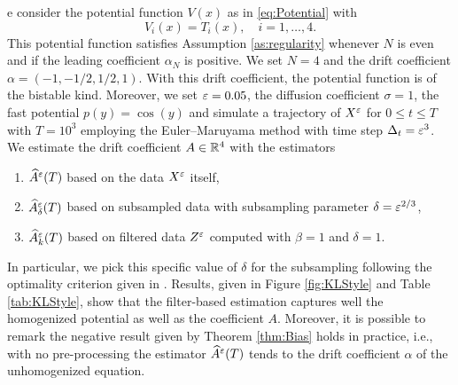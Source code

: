 \documentclass[10pt]{article}
\begin{document}
e consider the potential function $V(x)$ as in \eqref{eq:Potential} with
\begin{equation}
V_i(x) = T_i(x), \quad i =1, \ldots, 4.
\end{equation}
This potential function satisfies Assumption \ref{as:regularity} whenever $N$ is even and if the leading coefficient $\alpha_N$ is positive. We set $N = 4$ and the drift coefficient $\alpha = (-1, -1/2, 1/2, 1)$. With this drift coefficient, the potential function is of the bistable kind. Moreover, we set $\varepsilon = 0.05$, the diffusion coefficient $\sigma = 1$, the fast potential $p(y) = \cos(y)$ and simulate a trajectory of $X^\varepsilon$ for $0 \leq t \leq T$ with $T = 10^3$ employing the Euler--Maruyama method with time step $\Delta_t = \varepsilon^3$. We estimate the drift coefficient $A \in \mathbb{R}^4$ with the estimators
\begin{enumerate}
	\item $\widehat A^\varepsilon(T)$ based on the data $X^\varepsilon$ itself,
	\item $\widehat A^\varepsilon_\delta(T)$ based on subsampled data with subsampling parameter $\delta = \varepsilon^{2/3}$,
	\item $\widehat A^\varepsilon_k(T)$ based on filtered data $Z^\varepsilon$ computed with $\beta = 1$ and $\delta = 1$.
\end{enumerate}
In particular, we pick this specific value of $\delta$ for the subsampling following the optimality criterion given in \cite{PaS07}. Results, given in Figure \ref{fig:KLStyle} and Table \ref{tab:KLStyle}, show that the filter-based estimation captures well the homogenized potential as well as the coefficient $A$. Moreover, it is possible to remark the negative result given by Theorem \ref{thm:Bias} holds in practice, i.e., with no pre-processing the estimator $\widehat A^\varepsilon(T)$ tends to the drift coefficient $\alpha$ of the unhomogenized equation.
\end{document}
